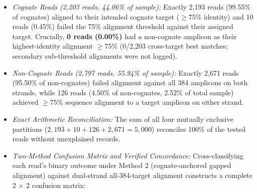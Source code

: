 \documentclass[
]{article}
\providecommand{\tightlist}{%
  \setlength{\itemsep}{0pt}\setlength{\parskip}{0pt}}
\begin{document}
\begin{enumerate}
  \begin{itemize}
  \tightlist
  \item
    \emph{Cognate Reads (2,203 reads, 44.06\% of sample):} Exactly 2,193
    reads (99.55\% of cognates) aligned to their intended cognate target
    (\(\ge 75\%\) identity) and 10 reads (0.45\%) failed the 75\%
    alignment threshold against their assigned target. Crucially,
    \textbf{0 reads (0.00\%)} had a non-cognate amplicon as their
    highest-identity alignment \(\ge 75\%\) (0/2,203 cross-target best
    matches; secondary sub-threshold alignments were not logged).
  \item
    \emph{Non-Cognate Reads (2,797 reads, 55.94\% of sample):} Exactly
    2,671 reads (95.50\% of non-cognates) failed alignment against all
    384 amplicons on both strands, while 126 reads (4.50\% of
    non-cognates, 2.52\% of total sample) achieved \(\ge 75\%\) sequence
    alignment to a target amplicon on either strand.
  \item
    \emph{Exact Arithmetic Reconciliation:} The sum of all four mutually
    exclusive partitions (\(2,193 + 10 + 126 + 2,671 = 5,000\))
    reconciles 100\% of the tested reads without unexplained records.
  \item
    \emph{Two-Method Confusion Matrix and Verified Concordance:}
    Cross-classifying each read's binary outcome under Method 2
    (cognate-anchored gapped alignment) against dual-strand
    all-384-target alignment constructs a complete 2 \(\times\) 2
    confusion matrix:


\end{itemize}
\end{enumerate}
\end{document}
